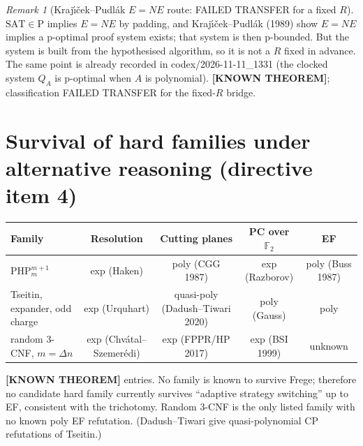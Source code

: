 \documentclass[11pt]{article}
\theoremstyle{remark}
\newtheorem*{remark}{Remark}
\newcommand{\SAT}{\mathrm{SAT}}
\newcommand{\status}[1]{\textbf{[#1]}}
\begin{document}
\begin{remark}[Kraj\'\i\v{c}ek--Pudl\'ak $E=NE$ route: FAILED TRANSFER for a fixed $R$]
$\SAT\in\mathrm P$ implies $E=NE$ by padding, and Kraj\'\i\v{c}ek--Pudl\'ak (1989) show
$E=NE$ implies a p-optimal proof system exists; that system is then p-bounded. But the system is
built from the hypothesised algorithm, so it is not a $R$ fixed in advance. The same point is
already recorded in codex/2026-11-11\_1331 (the clocked system $Q_A$ is p-optimal when $A$ is
polynomial). \status{KNOWN THEOREM}; classification FAILED TRANSFER for the fixed-$R$ bridge.
\end{remark}

\section{Survival of hard families under alternative reasoning (directive item 4)}
\begin{center}\small
\begin{tabular}{lcccc}
\toprule
Family & Resolution & Cutting planes & PC over $\mathbb F_2$ & EF\\
\midrule
PHP$^{m+1}_m$ & exp (Haken) & poly (CGG 1987) & exp (Razborov) & poly (Buss 1987)\\
Tseitin, expander, odd charge & exp (Urquhart) & quasi-poly (Dadush--Tiwari 2020) & poly (Gauss) & poly\\
random 3-CNF, $m=\Delta n$ & exp (Chv\'atal--Szemer\'edi) & exp (FPPR/HP 2017) & exp (BSI 1999) & unknown\\
\bottomrule
\end{tabular}
\end{center}
\status{KNOWN THEOREM} entries. No family is known to survive Frege; therefore no candidate
hard family currently survives ``adaptive strategy switching'' up to EF, consistent with the
trichotomy. Random 3-CNF is the only listed family with no known poly EF refutation.
(Dadush--Tiwari give quasi-polynomial CP refutations of Tseitin.)
\end{document}
